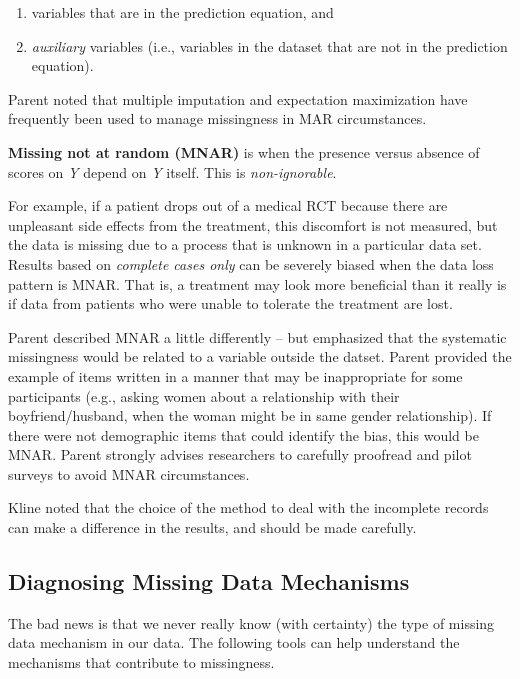 \documentclass[
  english,
]{book}
\providecommand{\tightlist}{%
  \setlength{\itemsep}{0pt}\setlength{\parskip}{0pt}}
\begin{document}
\begin{enumerate}
\def\labelenumi{\arabic{enumi}.}
\tightlist
\item
  variables that are in the prediction equation, and
\item
  \emph{auxiliary} variables (i.e., variables in the dataset that are not in the prediction equation).
\end{enumerate}

Parent \citeyearpar{parent_handling_2013} noted that multiple imputation and expectation maximization have frequently been used to manage missingness in MAR circumstances.

\textbf{Missing not at random (MNAR)} is when the presence versus absence of scores on \emph{Y} depend on \emph{Y} itself. This is \emph{non-ignorable}.

For example, if a patient drops out of a medical RCT because there are unpleasant side effects from the treatment, this discomfort is not measured, but the data is missing due to a process that is unknown in a particular data set. Results based on \emph{complete cases only} can be severely biased when the data loss pattern is MNAR. That is, a treatment may look more beneficial than it really is if data from patients who were unable to tolerate the treatment are lost.

Parent \citeyearpar{parent_handling_2013} described MNAR a little differently -- but emphasized that the systematic missingness would be related to a variable outside the datset. Parent provided the example of items written in a manner that may be inappropriate for some participants (e.g., asking women about a relationship with their boyfriend/husband, when the woman might be in same gender relationship). If there were not demographic items that could identify the bias, this would be MNAR. Parent strongly advises researchers to carefully proofread and pilot surveys to avoid MNAR circumstances.

Kline \citeyearpar{kline_principles_2016} noted that the choice of the method to deal with the incomplete records can make a difference in the results, and should be made carefully.

\hypertarget{diagnosing-missing-data-mechanisms}{%
\subsection{Diagnosing Missing Data Mechanisms}\label{diagnosing-missing-data-mechanisms}}

The bad news is that we never really know (with certainty) the type of missing data mechanism in our data. The following tools can help understand the mechanisms that contribute to missingness.
\end{document}
